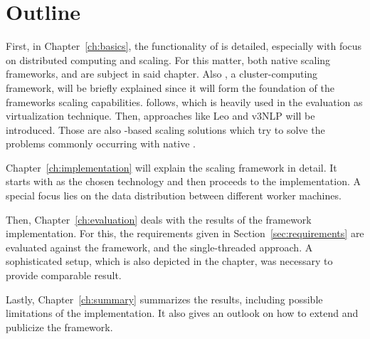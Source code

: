 \section{Outline}
First, in Chapter~\ref{ch:basics}, the functionality of \uima{} is detailed, especially with focus on distributed computing and scaling. For this matter, both native \uima{} scaling frameworks, \uimaas{} and \cpe{} are subject in said chapter. Also \spark{}, a cluster-computing framework, will be briefly explained since it will form the foundation of the frameworks scaling capabilities. \docker{} follows, which is heavily used in the evaluation as virtualization technique. Then, approaches like Leo and v3NLP will be introduced. Those are also \uimaas{}-based scaling solutions which try to solve the problems commonly occurring with native \uimaas{}.

Chapter~\ref{ch:implementation} will explain the scaling framework in detail. It starts with \spark{} as the chosen technology and then proceeds to the implementation. A special focus lies on the data distribution between different worker machines.

Then, Chapter~\ref{ch:evaluation} deals with the results of the framework implementation. For this, the requirements given in Section~\ref{sec:requirements} are evaluated against the framework, \uimaas{} and the single-threaded approach. A sophisticated setup, which is also depicted in the chapter, was necessary to provide comparable result.

Lastly, Chapter~\ref{ch:summary} summarizes the results, including possible limitations of the implementation. It also gives an outlook on how to extend and publicize the framework.